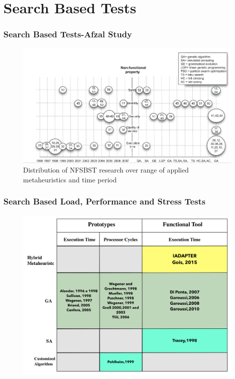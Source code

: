 \documentclass{beamer}
\begin{document}
\section{Search Based Tests}

\begin{frame}
\frametitle{Search Based Tests-Afzal Study}
\begin{figure}[H]
\centering
\includegraphics[width=1\linewidth]{afzal.png}
\caption{Distribution of NFSBST research over range of applied metaheuristics and time period  \cite{Afzal2009}}
\end{figure}
\end{frame}





\begin{frame}
\frametitle{Search Based Load, Performance and Stress Tests}
\begin{figure}[H]
\centering
\includegraphics[width=0.8\linewidth]{comparativo1.png}
\end{figure}
\end{frame}
\end{document}
